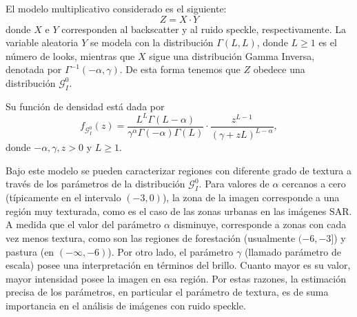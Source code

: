 \documentclass[12pt]{article}
\begin{document}
El modelo multiplicativo considerado es el siguiente:
\begin{equation*}
Z=X \cdot Y  
\end{equation*}
donde $X$ e $Y$ corresponden al backscatter y al ruido speckle, respectivamente. La variable aleatoria $Y$ se modela con la distribución $\Gamma ( L,L) $, donde $L\geq 1$ es el número de looks, mientras que $X$ sigue una distribución Gamma Inversa, denotada por  $\Gamma^{-1}(-\alpha ,\gamma) $. De esta forma tenemos que $Z$ obedece una distribución $\mathcal G_I^0$.

Su función de densidad está dada por
\begin{equation*}
f_{\mathcal{G}_I^{0}}( z) =\frac{L^{L}\Gamma ( L-\alpha
	) }{\gamma ^{\alpha }\Gamma ( -\alpha ) \Gamma (
	L) }\cdot  
\frac{z^{L-1}}{( \gamma +zL) ^{L-\alpha }},%
\label{ec_dens_gI0}
\end{equation*}
donde $-\alpha,\gamma ,z>0$ y $L\geq 1$.

Bajo este modelo se pueden caracterizar regiones con diferente grado de textura a través de los parámetros de la distribución $\mathcal{G}_I^{0}$. 
Para valores de $\alpha$ cercanos a cero (típicamente en el intervalo $(-3,0)$), la zona de la imagen corresponde a una región muy texturada, como es el caso de las zonas urbanas en las imágenes SAR. A medida que el valor del parámetro $\alpha$ disminuye, corresponde a zonas con cada vez menos textura, como son las regiones de forestación (usualmente $(-6,-3]$) y pastura (en $(-\infty,-6)$). Por otro lado, el parámetro $\gamma$ (llamado parámetro de escala) posee una interpretación en términos del brillo. Cuanto mayor es su valor, mayor intensidad posee la imagen en esa región. Por estas razones, la estimación precisa de los parámetros, en particular el parámetro de textura, es de suma importancia en el análisis de imágenes con ruido speckle. 

\end{document}
